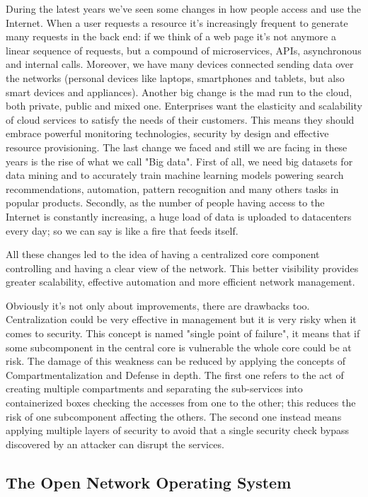 \documentclass[a4paper,10pt]{memoir}
\begin{document}
During the latest years we've seen some changes in how people access and use the Internet. When a user requests a resource it's increasingly frequent to generate many requests in the back end: if we think of a web page it's not anymore a linear sequence of requests, but a compound of microservices, APIs, asynchronous and internal calls. Moreover, we have many devices connected sending data over the networks (personal devices like laptops, smartphones and tablets, but also smart devices and appliances). Another big change is the mad run to the cloud, both private, public and mixed one. Enterprises want the elasticity and scalability of cloud services to satisfy the needs of their customers. This means they should embrace powerful monitoring technologies, security by design and effective resource provisioning. The last change we faced and still we are facing in these years is the rise of what we call "Big data". First of all, we need big datasets for data mining and to accurately train machine learning models powering search recommendations, automation, pattern recognition and many others tasks in popular products. Secondly, as the number of people having access to the Internet is constantly increasing, a huge load of data is uploaded to datacenters every day; so we can say is like a fire that feeds itself.

All these changes led to the idea of having a centralized core component controlling and having a clear view of the network. This better visibility provides greater scalability, effective automation and more efficient network management.

Obviously it's not only about improvements, there are drawbacks too. Centralization could be very effective in management but it is very risky when it comes to security. This concept is named "single point of failure", it means that if some subcomponent in the central core is vulnerable the whole core could be at risk. The damage of this weakness can be reduced by applying the concepts of Compartmentalization and Defense in depth. The first one refers to the act of creating multiple compartments and separating the sub-services into containerized boxes checking the accesses from one to the other; this reduces the risk of one subcomponent affecting the others. The second one instead means applying multiple layers of security to avoid that a single security check bypass discovered by an attacker can disrupt the services.


\subsection{The Open Network Operating System} 
\end{document}
